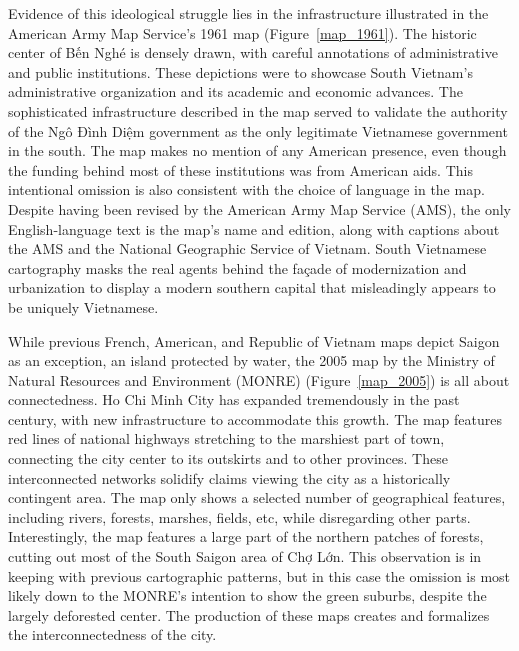 Evidence of this ideological struggle lies in the infrastructure illustrated in the American Army Map Service’s 1961 map (Figure~\ref{map_1961}). The historic center of Bến Nghé is densely drawn, with careful annotations of administrative and public institutions. These depictions were to showcase South Vietnam’s administrative organization and its academic and economic advances. The sophisticated infrastructure described in the map served to validate the authority of the Ngô Đình Diệm government as the only legitimate Vietnamese government in the south. The map makes no mention of any American presence, even though the funding behind most of these institutions was from American aids. This intentional omission is also consistent with the choice of language in the map. Despite having been revised by the American Army Map Service (AMS), the only English-language text is the map’s name and edition, along with captions about the AMS and the National Geographic Service of Vietnam. South Vietnamese cartography masks the real agents behind the façade of modernization and urbanization to display a modern southern capital that misleadingly appears to be uniquely Vietnamese.

While previous French, American, and Republic of Vietnam maps depict Saigon as an exception, an island protected by water, the 2005 map by the Ministry of Natural Resources and Environment (MONRE) (Figure~\ref{map_2005}) is all about connectedness. Ho Chi Minh City has expanded tremendously in the past century, with new infrastructure to accommodate this growth. The map features red lines of national highways stretching to the marshiest part of town, connecting the city center to its outskirts and to other provinces. These interconnected networks solidify claims viewing the city as a historically contingent area. The map only shows a selected number of geographical features, including rivers, forests, marshes, fields, etc, while disregarding other parts. Interestingly, the map features a large part of the northern patches of forests, cutting out most of the South Saigon area of Chợ Lớn. This observation is in keeping with previous cartographic patterns, but in this case the omission is most likely down to the MONRE’s intention to show the green suburbs, despite the largely deforested center. The production of these maps creates and formalizes the interconnectedness of the city. 

